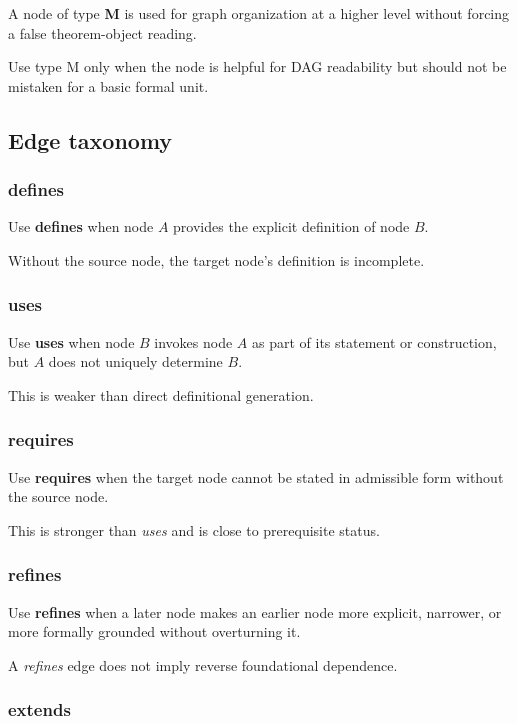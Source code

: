 \documentclass[11pt,a4paper]{article}
\begin{document}
	A node of type \textbf{M} is used for graph organization at a higher level without forcing a false
	theorem-object reading.
	
	Use type M only when the node is helpful for DAG readability but should not be mistaken for a
	basic formal unit.
	
	\subsection{Edge taxonomy}
	
	\subsubsection*{defines}
	
	Use \textbf{defines} when node $A$ provides the explicit definition of node $B$.
	
	Without the source node, the target node's definition is incomplete.
	
	\subsubsection*{uses}
	
	Use \textbf{uses} when node $B$ invokes node $A$ as part of its statement or construction, but
	$A$ does not uniquely determine $B$.
	
	This is weaker than direct definitional generation.
	
	\subsubsection*{requires}
	
	Use \textbf{requires} when the target node cannot be stated in admissible form without the source node.
	
	This is stronger than \emph{uses} and is close to prerequisite status.
	
	\subsubsection*{refines}
	
	Use \textbf{refines} when a later node makes an earlier node more explicit, narrower, or more
	formally grounded without overturning it.
	
	A \emph{refines} edge does not imply reverse foundational dependence.
	
	\subsubsection*{extends}
	
\end{document}
